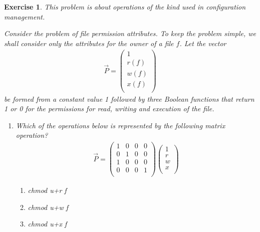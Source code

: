 \documentclass{book}
\newtheorem{exercise}{Exercise}
\def\beq{\begin{eqnarray}}
\def\eeq{\end{eqnarray}}
\begin{document}
\begin{exercise} 

This problem is about {\em operations} of the kind used in configuration management.

Consider the problem of file permission attributes. To keep the problem simple,
we shall consider only the attributes for the owner of a file $f$. Let the
vector
\beq
\vec P = \left(
\begin{array}{c}
1\\
r(f)\\
w(f)\\
x(f)\\
\end{array}
\right)
\eeq
be formed from a constant value 1 followed by three Boolean functions
that return 1 or 0 for the permissions for read, writing and execution of the
file.

\begin{enumerate}
\item Which of the operations below is represented by the following matrix operation?
\beq
\vec P = \left(
\begin{array}{cccc}
1 & 0 & 0 & 0\\
0 & 1 & 0 & 0\\
1 & 0 & 0 & 0\\
0 & 0 & 0 & 1\\
\end{array}
\right)
\left(
\begin{array}{c}
1\\
r\\
w\\
x\\
\end{array}
\right)
\eeq

 \begin{enumerate}
 \item chmod u+r f
 \item chmod u+w f
 \item chmod u+x f
 \end{enumerate}

\end{enumerate}


\end{exercise}
\begin{solution}
\end{solution}
\end{document}
